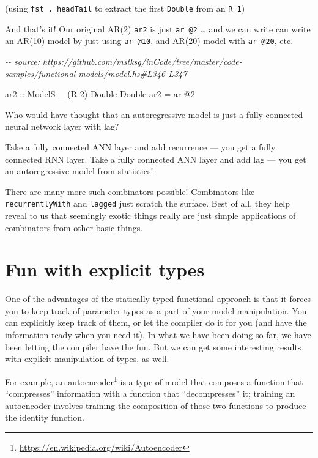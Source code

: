 \documentclass[]{article}
\newenvironment{Shaded}{}{}
\newcommand{\CommentTok}[1]{\textcolor[rgb]{0.38,0.63,0.69}{\textit{#1}}}
\newcommand{\DataTypeTok}[1]{\textcolor[rgb]{0.56,0.13,0.00}{#1}}
\newcommand{\DecValTok}[1]{\textcolor[rgb]{0.25,0.63,0.44}{#1}}
\newcommand{\NormalTok}[1]{#1}
\newcommand{\OperatorTok}[1]{\textcolor[rgb]{0.40,0.40,0.40}{#1}}
\newcommand{\OtherTok}[1]{\textcolor[rgb]{0.00,0.44,0.13}{#1}}
\renewcommand{\href}[2]{#2\footnote{\url{#1}}}
\begin{document}
(using \texttt{fst\ .\ headTail} to extract the first \texttt{Double} from an
\texttt{R\ 1})

And that's it! Our original AR(2) \texttt{ar2} is just \texttt{ar\ @2} \ldots{}
and we can write can write an AR(10) model by just using \texttt{ar\ @10}, and
AR(20) model with \texttt{ar\ @20}, etc.

\begin{Shaded}
\begin{Highlighting}[]
\CommentTok{{-}{-} source: https://github.com/mstksg/inCode/tree/master/code{-}samples/functional{-}models/model.hs\#L346{-}L347}

\OtherTok{ar2\textquotesingle{} ::} \DataTypeTok{ModelS}\NormalTok{ \_ (}\DataTypeTok{R} \DecValTok{2}\NormalTok{) }\DataTypeTok{Double} \DataTypeTok{Double}
\NormalTok{ar2\textquotesingle{} }\OtherTok{=}\NormalTok{ ar }\OperatorTok{@}\DecValTok{2}
\end{Highlighting}
\end{Shaded}

Who would have thought that an autoregressive model is just a fully connected
neural network layer with lag?

Take a fully connected ANN layer and add recurrence --- you get a fully
connected RNN layer. Take a fully connected ANN layer and add lag --- you get an
autoregressive model from statistics!

There are many more such combinators possible! Combinators like
\texttt{recurrentlyWith} and \texttt{lagged} just scratch the surface. Best of
all, they help reveal to us that seemingly exotic things really are just simple
applications of combinators from other basic things.

\section{Fun with explicit types}\label{fun-with-explicit-types}

One of the advantages of the statically typed functional approach is that it
forces you to keep track of parameter types as a part of your model
manipulation. You can explicitly keep track of them, or let the compiler do it
for you (and have the information ready when you need it). In what we have been
doing so far, we have been letting the compiler have the fun. But we can get
some interesting results with explicit manipulation of types, as well.

For example, an \href{https://en.wikipedia.org/wiki/Autoencoder}{autoencoder} is
a type of model that composes a function that ``compresses'' information with a
function that ``decompresses'' it; training an autoencoder involves training the
composition of those two functions to produce the identity function.
\end{document}
